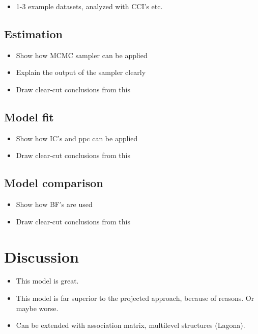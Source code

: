 \documentclass[12pt,a4paper]{article}\usepackage[]{graphicx}\usepackage[]{color}
\begin{document}
\begin{itemize}
\item 1-3 example datasets, analyzed with CCI's etc.
\end{itemize}

\subsection{Estimation}

\begin{itemize}
\item Show how MCMC sampler can be applied
\item Explain the output of the sampler clearly
\item Draw clear-cut conclusions from this
\end{itemize}

\subsection{Model fit}

\begin{itemize}
\item Show how IC's and ppc can be applied
\item Draw clear-cut conclusions from this
\end{itemize}

\subsection{Model comparison}

\begin{itemize}
\item Show how BF's are used
\item Draw clear-cut conclusions from this
\end{itemize}

\section{Discussion}

\begin{itemize}
\item This model is great.
\item This model is far superior to the projected approach, because of reasons. Or maybe worse.
\item Can be extended with association matrix, multilevel structures (Lagona).
\end{itemize}
\end{document}
